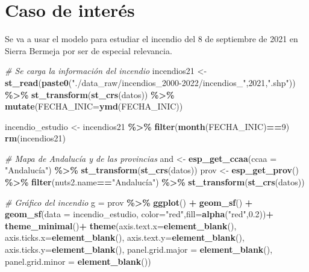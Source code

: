 \documentclass[12pt,a4paper,]{book}
\newenvironment{Shaded}{\begin{snugshade}}{\end{snugshade}}
\newcommand{\AttributeTok}[1]{\textcolor[rgb]{0.13,0.29,0.53}{#1}}
\newcommand{\CommentTok}[1]{\textcolor[rgb]{0.56,0.35,0.01}{\textit{#1}}}
\newcommand{\DecValTok}[1]{\textcolor[rgb]{0.00,0.00,0.81}{#1}}
\newcommand{\FloatTok}[1]{\textcolor[rgb]{0.00,0.00,0.81}{#1}}
\newcommand{\FunctionTok}[1]{\textcolor[rgb]{0.13,0.29,0.53}{\textbf{#1}}}
\newcommand{\NormalTok}[1]{#1}
\newcommand{\OtherTok}[1]{\textcolor[rgb]{0.56,0.35,0.01}{#1}}
\newcommand{\SpecialCharTok}[1]{\textcolor[rgb]{0.81,0.36,0.00}{\textbf{#1}}}
\newcommand{\StringTok}[1]{\textcolor[rgb]{0.31,0.60,0.02}{#1}}
\numberwithin{dummy}{section}
\theoremstyle{ocrenumbox}
\theoremstyle{blacknumex}
\theoremstyle{blacknumbox}
\theoremstyle{ocrenum}
\theoremstyle{ocrenum}
\begin{document}
\hypertarget{caso-de-interuxe9s-1}{%
\section{Caso de interés}\label{caso-de-interuxe9s-1}}

Se va a usar el modelo para estudiar el incendio del 8 de septiembre de
2021 en Sierra Bermeja por ser de especial relevancia.

\begin{Shaded}
\begin{Highlighting}[]
\CommentTok{\# Se carga la información del incendio}
\NormalTok{incendios21 }\OtherTok{\textless{}{-}} \FunctionTok{st\_read}\NormalTok{(}\FunctionTok{paste0}\NormalTok{(}\StringTok{"./data\_raw/incendios\_2000{-}2022/incendios\_"}\NormalTok{,}\DecValTok{2021}\NormalTok{,}\StringTok{".shp"}\NormalTok{)) }\SpecialCharTok{\%\textgreater{}\%} 
  \FunctionTok{st\_transform}\NormalTok{(}\FunctionTok{st\_crs}\NormalTok{(datos)) }\SpecialCharTok{\%\textgreater{}\%} 
  \FunctionTok{mutate}\NormalTok{(}\AttributeTok{FECHA\_INIC=}\FunctionTok{ymd}\NormalTok{(FECHA\_INIC))}

\NormalTok{incendio\_estudio }\OtherTok{\textless{}{-}}\NormalTok{ incendios21 }\SpecialCharTok{\%\textgreater{}\%} \FunctionTok{filter}\NormalTok{(}\FunctionTok{month}\NormalTok{(FECHA\_INIC)}\SpecialCharTok{==}\DecValTok{9}\NormalTok{)}
\FunctionTok{rm}\NormalTok{(incendios21)}

\CommentTok{\# Mapa de Andalucía y de las provincias}
\NormalTok{and }\OtherTok{\textless{}{-}} \FunctionTok{esp\_get\_ccaa}\NormalTok{(}\AttributeTok{ccaa =} \StringTok{"Andalucía"}\NormalTok{) }\SpecialCharTok{\%\textgreater{}\%} \FunctionTok{st\_transform}\NormalTok{(}\FunctionTok{st\_crs}\NormalTok{(datos))}
\NormalTok{prov }\OtherTok{\textless{}{-}} \FunctionTok{esp\_get\_prov}\NormalTok{() }\SpecialCharTok{\%\textgreater{}\%} \FunctionTok{filter}\NormalTok{(nuts2.name}\SpecialCharTok{==}\StringTok{"Andalucía"}\NormalTok{) }\SpecialCharTok{\%\textgreater{}\%} \FunctionTok{st\_transform}\NormalTok{(}\FunctionTok{st\_crs}\NormalTok{(datos))}

\CommentTok{\# Gráfico del incendio}
\NormalTok{g }\OtherTok{=}\NormalTok{ prov }\SpecialCharTok{\%\textgreater{}\%} 
  \FunctionTok{ggplot}\NormalTok{() }\SpecialCharTok{+}
  \FunctionTok{geom\_sf}\NormalTok{() }\SpecialCharTok{+} 
  \FunctionTok{geom\_sf}\NormalTok{(}\AttributeTok{data =}\NormalTok{ incendio\_estudio, }\AttributeTok{color=}\StringTok{"red"}\NormalTok{,}\AttributeTok{fill=}\FunctionTok{alpha}\NormalTok{(}\StringTok{"red"}\NormalTok{,}\FloatTok{0.2}\NormalTok{))}\SpecialCharTok{+}
  \FunctionTok{theme\_minimal}\NormalTok{()}\SpecialCharTok{+}
  \FunctionTok{theme}\NormalTok{(}\AttributeTok{axis.text.x=}\FunctionTok{element\_blank}\NormalTok{(),}
        \AttributeTok{axis.ticks.x=}\FunctionTok{element\_blank}\NormalTok{(),}
        \AttributeTok{axis.text.y=}\FunctionTok{element\_blank}\NormalTok{(),}
        \AttributeTok{axis.ticks.y=}\FunctionTok{element\_blank}\NormalTok{(),}
        \AttributeTok{panel.grid.major =} \FunctionTok{element\_blank}\NormalTok{(),}
        \AttributeTok{panel.grid.minor =} \FunctionTok{element\_blank}\NormalTok{()) }


\end{Highlighting}
\end{Shaded}
\end{document}
